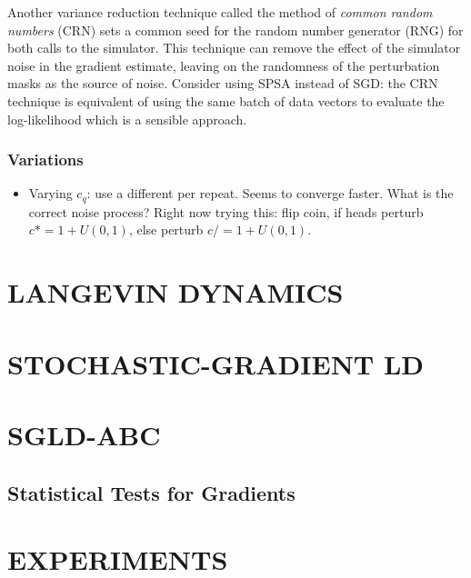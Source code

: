 \documentclass[]{article}
\begin{document}
Another variance reduction technique called the method of {\em common random numbers} (CRN) \cite{kleinman1999} sets a common seed for the random number generator (RNG) for both calls to the simulator.  This technique can remove the effect of the simulator noise in the gradient estimate, leaving on the randomness of the perturbation masks as the source of noise. Consider using SPSA instead of SGD: the CRN technique is equivalent of using the same batch of data vectors to evaluate the log-likelihood which is a sensible approach.

\subsubsection{Variations}

\begin{itemize}
\item Varying $c_q$: use a different per repeat.  Seems to converge faster.  What is the correct noise process?  Right now trying this: flip coin, if heads perturb $c *= 1+U(0,1)$, else perturb $c /= 1 + U(0,1)$. 
\end{itemize}

\section{LANGEVIN DYNAMICS} \label{ld}


\section{STOCHASTIC-GRADIENT LD} \label{sgld}

\section{SGLD-ABC} \label{sgld}

\subsection{Statistical Tests for Gradients}

\section{EXPERIMENTS} \label{experiments}
\end{document}
